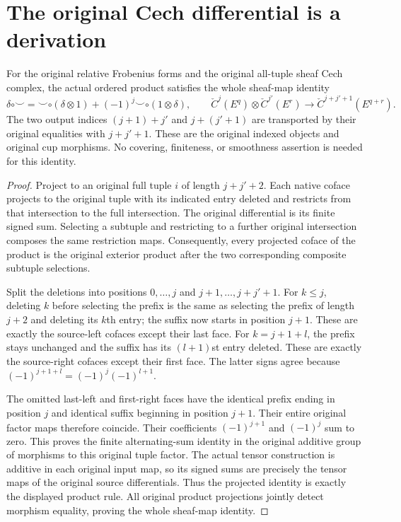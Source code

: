 \section{The original Cech differential is a derivation}

\begin{lemma}
\label{lem:native-cech-ordered-cup-leibniz}
\leanok
{}
For the original relative Frobenius forms and the original all-tuple
sheaf Cech complex, the actual ordered product satisfies the whole
sheaf-map identity
\[
 \delta\circ\smile=\smile\circ(\delta\otimes1)
      +(-1)^j\smile\circ(1\otimes\delta),
 \qquad \check C^j(E^q)\otimes\check C^{j'}(E^r)
       \longrightarrow\check C^{j+j'+1}(E^{q+r}).
\]
The two output indices $(j+1)+j'$ and $j+(j'+1)$ are transported
by their original equalities with $j+j'+1$. These are the original
indexed objects and original cup morphisms. No covering, finiteness,
or smoothness assertion is needed for this identity.
\end{lemma}
\begin{proof}
\leanok
Project to an original full tuple $i$ of length $j+j'+2$. Each
native coface projects to the original tuple with its indicated
entry deleted and restricts from that intersection to the full
intersection. The original differential is its finite signed sum.
Selecting a subtuple and restricting to a further original
intersection composes the same restriction maps. Consequently,
every projected coface of the product is the original exterior
product after the two corresponding composite subtuple selections.

Split the deletions into positions $0,\ldots,j$ and
$j+1,\ldots,j+j'+1$. For $k\leq j$, deleting $k$ before selecting
the prefix is the same as selecting the prefix of length $j+2$
and deleting its $k$th entry; the suffix now starts in position
$j+1$. These are exactly the source-left cofaces except their last
face. For $k=j+1+l$, the prefix stays unchanged and the suffix
has its $(l+1)$st entry deleted. These are exactly the source-right
cofaces except their first face. The latter signs agree because
$(-1)^{j+1+l}=(-1)^j(-1)^{l+1}$.

The omitted last-left and first-right faces have the identical
prefix ending in position $j$ and identical suffix beginning in
position $j+1$. Their entire original factor maps therefore coincide.
Their coefficients $(-1)^{j+1}$ and $(-1)^j$ sum to zero.
This proves the finite alternating-sum identity in the original
additive group of morphisms to this original tuple factor.
The actual tensor construction is additive in each original input
map, so its signed sums are precisely the tensor maps of the
original source differentials. Thus the projected identity is
exactly the displayed product rule. All original product projections
jointly detect morphism equality, proving the whole sheaf-map
identity.
\end{proof}
